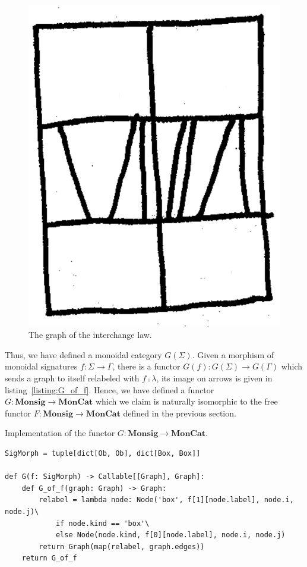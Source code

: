 \begin{figure}[H]
\centering
\includegraphics[scale=0.1]{img/interchange.png}
\caption{The graph of the interchange law.}
\label{fig:interchange}
\end{figure}

Thus, we have defined a monoidal category $G(\Sigma)$.
Given a morphism of monoidal signatures $f : \Sigma \to \Gamma$, there is a functor $G(f) : G(\Sigma) \to G(\Gamma)$ which sends a graph to itself relabeled with $f \fcmp \lambda$, its image on arrows is given in listing~\ref{listing:G_of_f}.
Hence, we have defined a functor $G : \mathbf{Monsig} \to \mathbf{MonCat}$ which we claim is naturally isomorphic to the free functor $F : \mathbf{Monsig} \to \mathbf{MonCat}$ defined in the previous section.

\begin{python}\label{listing:G_of_f}
{\normalfont Implementation of the functor $G : \mathbf{Monsig} \to \mathbf{MonCat}$.}

\begin{verbatim}
SigMorph = tuple[dict[Ob, Ob], dict[Box, Box]]

def G(f: SigMorph) -> Callable[[Graph], Graph]:
    def G_of_f(graph: Graph) -> Graph:
        relabel = lambda node: Node('box', f[1][node.label], node.i, node.j)\
            if node.kind == 'box'\
            else Node(node.kind, f[0][node.label], node.i, node.j)
        return Graph(map(relabel, graph.edges))
    return G_of_f
\end{verbatim}
\end{python}

